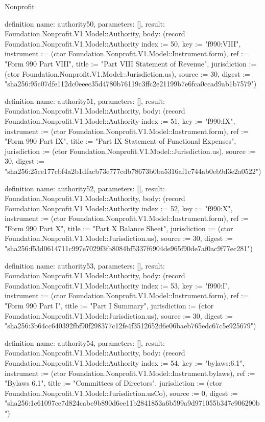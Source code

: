 \begin{lexlean}{Nonprofit}
\begin{semanticmodule}
definition{
  name: authority50,
  parameters: [],
  result: Foundation.Nonprofit.V1.Model::Authority,
  body: (record Foundation.Nonprofit.V1.Model::Authority {index := 50, key := "f990:VIII", instrument := (ctor Foundation.Nonprofit.V1.Model::Instrument.form), ref := "Form 990 Part VIII", title := "Part VIII Statement of Revenue", jurisdiction := (ctor Foundation.Nonprofit.V1.Model::Jurisdiction.us), source := 30, digest := "sha256:95c07dfe112dc0eeec35d4780b76119c3ffc2e21199b7e6fca0ccad9ab1b7579"})
}

definition{
  name: authority51,
  parameters: [],
  result: Foundation.Nonprofit.V1.Model::Authority,
  body: (record Foundation.Nonprofit.V1.Model::Authority {index := 51, key := "f990:IX", instrument := (ctor Foundation.Nonprofit.V1.Model::Instrument.form), ref := "Form 990 Part IX", title := "Part IX Statement of Functional Expenses", jurisdiction := (ctor Foundation.Nonprofit.V1.Model::Jurisdiction.us), source := 30, digest := "sha256:25ce177cbf4a2b1dfacb73e777cdb78673b0ba5316af1c744ab0eb9d3e2a0522"})
}

definition{
  name: authority52,
  parameters: [],
  result: Foundation.Nonprofit.V1.Model::Authority,
  body: (record Foundation.Nonprofit.V1.Model::Authority {index := 52, key := "f990:X", instrument := (ctor Foundation.Nonprofit.V1.Model::Instrument.form), ref := "Form 990 Part X", title := "Part X Balance Sheet", jurisdiction := (ctor Foundation.Nonprofit.V1.Model::Jurisdiction.us), source := 30, digest := "sha256:f53d0614711c997e7029f3fb8084bf5337f6904de965f90de7af0ac9f77ec281"})
}

definition{
  name: authority53,
  parameters: [],
  result: Foundation.Nonprofit.V1.Model::Authority,
  body: (record Foundation.Nonprofit.V1.Model::Authority {index := 53, key := "f990:I", instrument := (ctor Foundation.Nonprofit.V1.Model::Instrument.form), ref := "Form 990 Part I", title := "Part I Summary", jurisdiction := (ctor Foundation.Nonprofit.V1.Model::Jurisdiction.us), source := 30, digest := "sha256:3b64cc640392fbf90f298377c12fe4f3512652d6e06baeb765edc67c5e925679"})
}

definition{
  name: authority54,
  parameters: [],
  result: Foundation.Nonprofit.V1.Model::Authority,
  body: (record Foundation.Nonprofit.V1.Model::Authority {index := 54, key := "bylaws:6.1", instrument := (ctor Foundation.Nonprofit.V1.Model::Instrument.bylaws), ref := "Bylaws 6.1", title := "Committees of Directors", jurisdiction := (ctor Foundation.Nonprofit.V1.Model::Jurisdiction.usCo), source := 0, digest := "sha256:1c61097ce7d824cabe9b890d6ee11b2841853a6b599a9d971055b347c906290b"})
}


\end{semanticmodule}
\end{lexlean}
